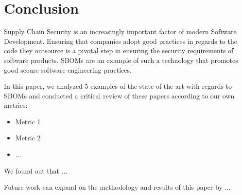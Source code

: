 \section{Conclusion}

Supply Chain Security is an increasingly important factor of modern Software Development. Ensuring that companies adopt good practices in regards to the code they outsource is a pivotal step in ensuring the security requirements of software products. SBOMs \cite{article:concept:sbom-2} are an example of such a technology that promotes good secure software engineering practices.

\noindent In this paper, we analyzed 5 examples of the state-of-the-art with regards to SBOMs and conducted a critical review of these papers according to our own metrics:
\begin{itemize}
    \item Metric 1
    \item Metric 2
    \item ...
\end{itemize}

\noindent We found out that ...

\noindent Future work can expand on the methodology and results of this paper by ...